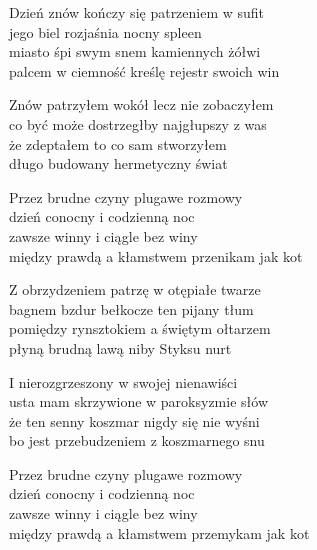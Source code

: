 \begin{text}
    Dzień znów kończy się patrzeniem w sufit\\
    jego biel rozjaśnia nocny spleen\\
    miasto śpi swym snem kamiennych żółwi\\
    palcem w ciemność kreślę rejestr swoich win

    Znów patrzyłem wokół lecz nie zobaczyłem\\
    co być może dostrzegłby najgłupszy z was\\
    że zdeptałem to co sam stworzyłem\\
    długo budowany hermetyczny świat

    Przez brudne czyny plugawe rozmowy\\
    dzień conocny i codzienną noc\\
    zawsze winny i ciągle bez winy\\
    między prawdą a kłamstwem przenikam jak kot

    Z obrzydzeniem patrzę w otępiałe twarze\\
    bagnem bzdur bełkocze ten pijany tłum\\
    pomiędzy rynsztokiem a świętym ołtarzem\\
    płyną brudną lawą niby Styksu nurt

    I nierozgrzeszony w swojej nienawiści\\
    usta mam skrzywione w paroksyzmie słów\\
    że ten senny koszmar nigdy się nie wyśni\\
    bo jest przebudzeniem z koszmarnego snu

    Przez brudne czyny plugawe rozmowy\\
    dzień conocny i codzienną noc\\
    zawsze winny i ciągle bez winy\\
    między prawdą a kłamstwem przemykam jak kot
\end{text}
\begin{chord}

\end{chord}